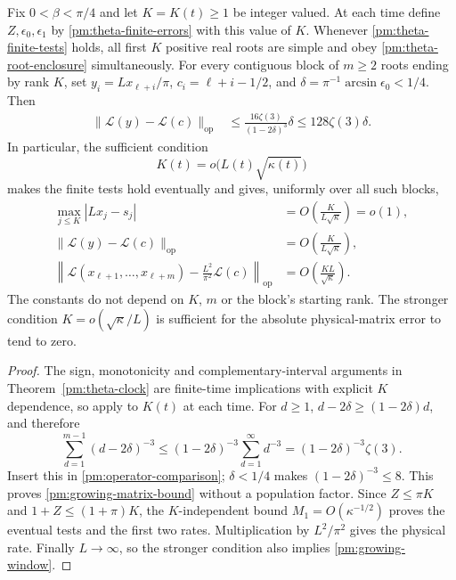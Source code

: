 \begin{corollary}
\label{pm:theta-growing-clock}
Fix $0<\beta<\pi/4$ and let $K=K(t)\ge1$ be integer valued. At each
time define $Z,\epsilon_0,\epsilon_1$ by
\eqref{pm:theta-finite-errors} with this value of $K$. Whenever
\eqref{pm:theta-finite-tests} holds, all first $K$ positive real roots
are simple and obey \eqref{pm:theta-root-enclosure} simultaneously.
For every contiguous block of $m\ge2$ roots ending by rank $K$, set
$y_i=Lx_{\ell+i}/\pi$, $c_i=\ell+i-1/2$, and
$\delta=\pi^{-1}\arcsin\epsilon_0<1/4$. Then
\begin{align}
 \|\mathcal L(y)-\mathcal L(c)\|_{\mathrm{op}}
 &\le\frac{16\zeta(3)}{(1-2\delta)^3}\delta
 \le128\zeta(3)\delta.\label{pm:growing-matrix-bound}
\end{align}
In particular, the sufficient condition
\begin{equation}\label{pm:growing-window}
 K(t)=o\bigl(L(t)\sqrt{\kappa(t)}\bigr)
\end{equation}
makes the finite tests hold eventually and gives, uniformly over all
such blocks,
\begin{align}
 \max_{j\le K}|Lx_j-s_j|
   &=O\!\left(\frac K{L\sqrt\kappa}\right)=o(1),
       \label{pm:growing-root-rate}\\
 \|\mathcal L(y)-\mathcal L(c)\|_{\mathrm{op}}
   &=O\!\left(\frac K{L\sqrt\kappa}\right),
       \label{pm:growing-normalized-rate}\\
 \left\|\mathcal L(x_{\ell+1},\ldots,x_{\ell+m})
             -\frac{L^2}{\pi^2}\mathcal L(c)\right\|_{\mathrm{op}}
   &=O\!\left(\frac{KL}{\sqrt\kappa}\right).
       \label{pm:growing-physical-rate}
\end{align}
The constants do not depend on $K$, $m$ or the block's starting rank.
The stronger condition $K=o(\sqrt\kappa/L)$ is sufficient for the
absolute physical-matrix error to tend to zero.
\end{corollary}
\begin{proof}
The sign, monotonicity and complementary-interval arguments in
Theorem~\ref{pm:theta-clock} are finite-time implications with explicit
$K$ dependence, so apply to $K(t)$ at each time. For $d\ge1$,
$d-2\delta\ge(1-2\delta)d$, and therefore
\[
 \sum_{d=1}^{m-1}(d-2\delta)^{-3}
 \le(1-2\delta)^{-3}\sum_{d=1}^\infty d^{-3}
 =(1-2\delta)^{-3}\zeta(3).
\]
Insert this in \eqref{pm:operator-comparison}; $\delta<1/4$ makes
$(1-2\delta)^{-3}\le8$. This proves
\eqref{pm:growing-matrix-bound} without a population factor.
Since $Z\le\pi K$ and $1+Z\le(1+\pi)K$, the
$K$-independent bound $M_1=O(\kappa^{-1/2})$ proves the eventual
tests and the first two rates. Multiplication by $L^2/\pi^2$ gives
the physical rate. Finally $L\to\infty$, so the stronger condition
also implies \eqref{pm:growing-window}.
\end{proof}

